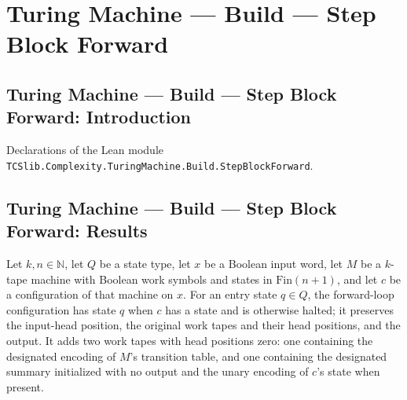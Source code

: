 \section{Turing Machine --- Build --- Step Block Forward}
\subsection*{Turing Machine --- Build --- Step Block Forward: Introduction}

Declarations of the Lean module \texttt{TCSlib.Complexity.TuringMachine.Build.StepBlockForward}.

\subsection*{Turing Machine --- Build --- Step Block Forward: Results}

\begin{definition}
\label{Turing.StepBlock.forwardLoopCfg}
\leanok
{}
Let $k,n\in\mathbb{N}$, let $Q$ be a state type, let $x$ be a Boolean input word, let
$M$ be a $k$-tape machine with Boolean work symbols and states in $\text{Fin}(n+1)$, and
let $c$ be a configuration of that machine on $x$. For an entry state $q\in Q$, the
forward-loop configuration has state $q$ when $c$ has a state and is otherwise halted;
it preserves the input-head position, the original work tapes and their head positions,
and the output. It adds two work tapes with head positions zero: one containing the
designated encoding of $M$'s transition table, and one containing the designated summary
initialized with no output and the unary encoding of $c$'s state when present.
\end{definition}

